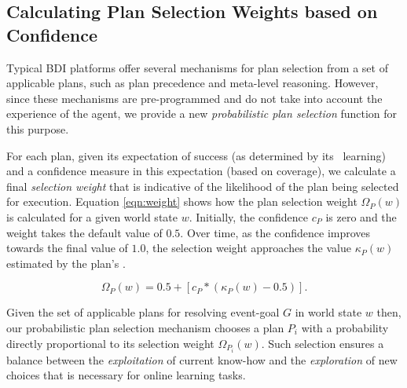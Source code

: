\subsection{Calculating Plan Selection Weights based on Confidence}


Typical BDI platforms offer several mechanisms for plan selection from a set of applicable plans, such as plan precedence and meta-level reasoning. However, since these mechanisms are pre-programmed and do not take into account the experience of the agent, we provide a new \textit{probabilistic plan selection} function for this purpose. 

For each plan, given its expectation of success (as determined by its \dt\ learning) and a confidence measure in this expectation (based on coverage), we calculate a final \textit{selection weight} that is indicative of the likelihood of the plan being selected for execution. Equation \ref{eqn:weight} shows how the plan selection weight $\Omega_P(w)$ is calculated for a given world state $w$. Initially, the confidence $c_P$ is zero and the weight takes the default value of $0.5$. Over time, as the confidence improves towards the final value of $1.0$, the selection weight approaches the value $\kappa_P(w)$ estimated by the plan's \dt.


\begin{equation}\label{eqn:weight}   
\Omega_P(w) = 0.5 + \left[  c_P *  \left( \kappa_P(w) - 0.5 \right)  \right].
\end{equation}


Given the set of applicable plans for resolving event-goal $G$ in world state $w$ then, our probabilistic plan selection mechanism chooses a plan $P_i$ with a probability directly proportional to its selection weight $\Omega_{P_i}(w)$. Such selection ensures a balance between the \emph{exploitation} of current know-how and the \textit{exploration} of new choices that is necessary for online learning tasks. 



